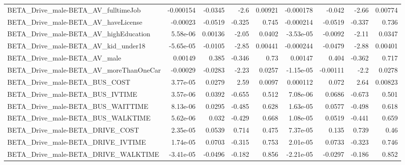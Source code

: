 \begin{tabular}{lrrrrrrrr}
BETA\_Drive\_male-BETA\_AV\_fulltimeJob                &   -0.000154 &      -0.0345 &      -2.6 &  0.00921 &  -0.000178 &      -0.042 &        -2.66 &       0.00774 \\
BETA\_Drive\_male-BETA\_AV\_haveLicense                &    -0.00023 &      -0.0519 &    -0.325 &    0.745 &  -0.000214 &     -0.0519 &       -0.337 &         0.736 \\
BETA\_Drive\_male-BETA\_AV\_highEducation              &    5.58e-06 &      0.00136 &     -2.05 &   0.0402 &  -3.53e-05 &     -0.0092 &        -2.11 &        0.0347 \\
BETA\_Drive\_male-BETA\_AV\_kid\_under18                &   -5.65e-05 &      -0.0105 &     -2.85 &  0.00441 &  -0.000244 &     -0.0479 &        -2.88 &       0.00401 \\
BETA\_Drive\_male-BETA\_AV\_male                       &     0.00149 &        0.385 &    -0.346 &     0.73 &    0.00147 &       0.404 &       -0.362 &         0.717 \\
BETA\_Drive\_male-BETA\_AV\_moreThanOneCar             &    -0.00029 &      -0.0283 &     -2.23 &   0.0257 &  -1.15e-05 &    -0.00111 &         -2.2 &        0.0278 \\
BETA\_Drive\_male-BETA\_BUS\_COST                      &    3.77e-05 &       0.0279 &      2.59 &   0.0097 &   0.000112 &       0.072 &         2.64 &       0.00823 \\
BETA\_Drive\_male-BETA\_BUS\_IVTIME                    &    3.57e-06 &       0.0392 &    -0.655 &    0.512 &   7.08e-06 &      0.0686 &       -0.673 &         0.501 \\
BETA\_Drive\_male-BETA\_BUS\_WAITTIME                  &    8.13e-06 &       0.0295 &    -0.485 &    0.628 &   1.63e-05 &      0.0577 &       -0.498 &         0.618 \\
BETA\_Drive\_male-BETA\_BUS\_WALKTIME                  &    5.62e-06 &        0.032 &    -0.429 &    0.668 &   1.08e-05 &      0.0519 &       -0.441 &         0.659 \\
BETA\_Drive\_male-BETA\_DRIVE\_COST                    &    2.35e-05 &       0.0539 &     0.714 &    0.475 &   7.37e-05 &       0.135 &        0.739 &          0.46 \\
BETA\_Drive\_male-BETA\_DRIVE\_IVTIME                  &    1.74e-05 &       0.0703 &    -0.315 &    0.753 &   2.01e-05 &      0.0733 &       -0.323 &         0.746 \\
BETA\_Drive\_male-BETA\_DRIVE\_WALKTIME                &   -3.41e-05 &      -0.0496 &    -0.182 &    0.856 &  -2.21e-05 &     -0.0297 &       -0.186 &         0.852 \\

\end{tabular}
